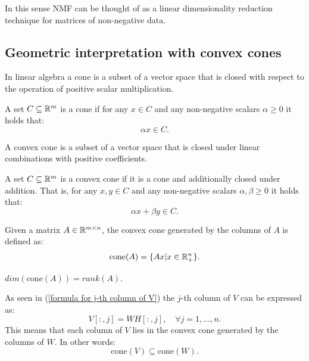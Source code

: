 In this sense NMF can be thought of as a linear dimensionality reduction technique for matrices of non-negative data.
\subsection{Geometric interpretation with convex cones}
In linear algebra a cone is a subset of a vector space that is closed with respect to the operation of positive scalar multiplication.
\begin{definition}[Cone]
A set $C \subseteq \mathbb{R}^m$ is a cone if for any $x \in C$ and any non-negative scalars $\alpha \geq 0$ it holds that:
\begin{equation}
    \alpha x \in C.
\end{equation}
\end{definition}
A convex cone is a subset of a vector space that is closed under linear combinations with positive coefficients.
\begin{definition}
    A set $C \subseteq \mathbb{R}^m$ is a convex cone if it is a cone and additionally closed under addition. That is, for any $x, y \in C$ and any non-negative scalars $\alpha, \beta \geq 0$ it holds that:
    \begin{equation}
        \alpha x + \beta y \in C.
    \end{equation}
\end{definition}
Given a matrix $A \in \mathbb{R}^{m \times n}$, the convex cone generated by the columns of $A$ is defined as:
\begin{equation}
    \text{cone}(A) = \{ Ax | x \in \mathbb{R}_+^{n} \}.
\end{equation}
\begin{observation}
    $dim(\text{cone}(A)) = rank(A)$.
\end{observation}
As seen in (\ref{formula for j-th column of V}) the $j$-th column of $V$ can be expressed as:
\begin{equation}
    V[:,j] = WH[:,j], \quad \forall j = 1, \ldots, n.
\end{equation}
This means that each column of $V$ lies in the convex cone generated by the columns of $W$.
In other words:
\begin{equation}
    \text{cone}(V) \subseteq \text{cone}(W).
\end{equation}
\par
